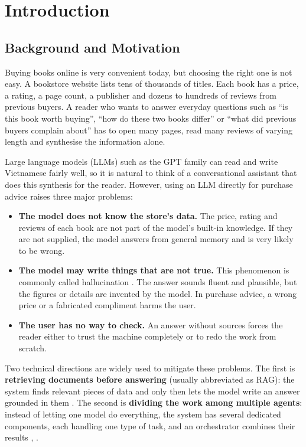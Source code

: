 \chapter{Introduction}
\label{ch:gioi-thieu}

\section{Background and Motivation}

Buying books online is very convenient today, but choosing the right one is not easy. A bookstore website lists tens of thousands of titles. Each book has a price, a rating, a page count, a publisher and dozens to hundreds of reviews from previous buyers. A reader who wants to answer everyday questions such as ``is this book worth buying'', ``how do these two books differ'' or ``what did previous buyers complain about'' has to open many pages, read many reviews of varying length and synthesise the information alone.

Large language models (LLMs) such as the GPT family can read and write Vietnamese fairly well, so it is natural to think of a conversational assistant that does this synthesis for the reader. However, using an LLM directly for purchase advice raises three major problems:

\begin{itemize}
    \item \textbf{The model does not know the store's data.} The price, rating and reviews of each book are not part of the model's built-in knowledge. If they are not supplied, the model answers from general memory and is very likely to be wrong.
    \item \textbf{The model may write things that are not true.} This phenomenon is commonly called hallucination . The answer sounds fluent and plausible, but the figures or details are invented by the model. In purchase advice, a wrong price or a fabricated compliment harms the user.
    \item \textbf{The user has no way to check.} An answer without sources forces the reader either to trust the machine completely or to redo the work from scratch.
\end{itemize}

Two technical directions are widely used to mitigate these problems. The first is \textbf{retrieving documents before answering} (usually abbreviated as RAG): the system finds relevant pieces of data and only then lets the model write an answer grounded in them . The second is \textbf{dividing the work among multiple agents}: instead of letting one model do everything, the system has several dedicated components, each handling one type of task, and an orchestrator combines their results , .

